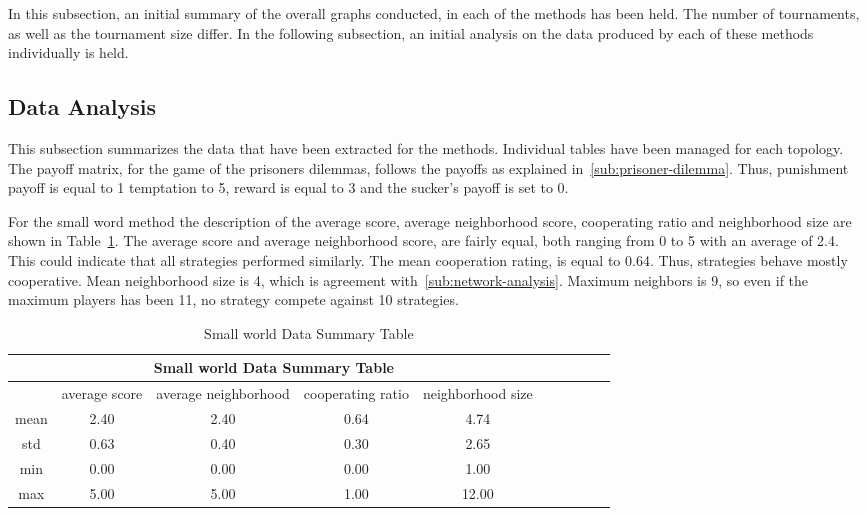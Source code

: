In this subsection, an initial summary of the overall graphs conducted, in
each of the methods has been held. The number of tournaments, as well as the
tournament size differ. In the following subsection, an initial analysis on the
data produced by each of these methods individually is held.

\subsection{Data Analysis}
This subsection summarizes the data that have been extracted for the methods.
Individual tables have been managed for each topology. The payoff matrix, for
the game of the prisoners dilemmas, follows the payoffs as explained in~\autoref{sub:prisoner-dilemma}.
Thus, punishment payoff is equal to 1 temptation to 5, reward is equal to 3 and
the sucker's payoff is set to 0.

For the small word method the description of the average score, average
neighborhood score, cooperating ratio and neighborhood size are shown in
Table~\ref{table:summary-small-data}. The average score and average
neighborhood score, are fairly equal, both ranging from 0 to 5 with an average of
2.4. This could indicate that all strategies performed similarly. The mean
cooperation rating, is equal to 0.64. Thus, strategies behave mostly cooperative.
Mean neighborhood size is 4, which is agreement with~\autoref{sub:network-analysis}.
Maximum neighbors is 9, so even if the maximum players has been 11, no strategy
compete against 10 strategies.

\begin{table}[!hbtp]
	\centering
	\begin{adjustbox}{width=0.8\textwidth}
		\small
		\begin{tabular}{cccccccccc}
				\toprule
			\multicolumn{5}{|c|}{Small world Data Summary Table}                                \\ \hline
			     & average score & average neighborhood & cooperating ratio & neighborhood size \\ \hline
			mean & 2.40          & 2.40                 & 0.64              & 4.74              \\ \hline
			std  & 0.63          & 0.40                 & 0.30              & 2.65              \\ \hline
			min  & 0.00          & 0.00                 & 0.00              & 1.00              \\ \hline
			max  & 5.00          & 5.00                 & 1.00              & 12.00             \\ \bottomrule
		\end{tabular}
	\end{adjustbox}
	\caption{Small world Data Summary Table}
	\label{table:summary-small-data}
\end{table}

